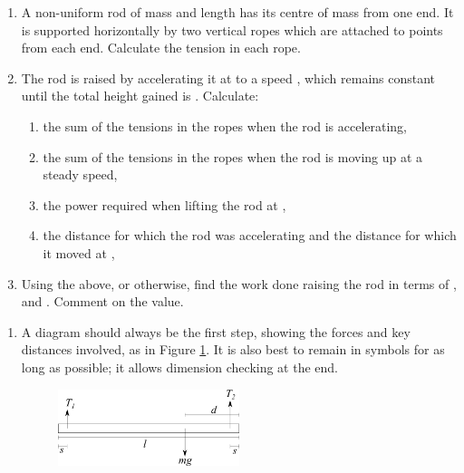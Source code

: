
\begin{problem} %
{\begin{enumerate}
	\item A non-uniform rod of mass  and length  has its centre of mass  from one end. It is supported horizontally by two vertical ropes which are attached to points  from each end. Calculate the tension in each rope.
	\item The rod is raised by accelerating it at  to a speed , which remains constant until the total height gained is . Calculate:
	\begin{enumerate}
		\item the sum of the tensions in the ropes when the rod is accelerating,
		\item the sum of the tensions in the ropes when the rod is moving up at a steady speed,
		\item the power required when lifting the rod at ,
		\item the distance for which the rod was accelerating and the distance for which it moved at ,
	\end{enumerate}
	\item Using the above, or otherwise, find the work done raising the rod in terms of ,  and . Comment on the value.
\end{enumerate}
}
{}
{\begin{enumerate}
	\item A diagram should always be the first step, showing the forces and key distances involved, as in Figure \ref{fig:Dynamics_rod_forces}. It is also best to remain in symbols for as long as possible; it allows dimension checking at the end.

\begin{figure}[h]
\centering
\includegraphics[width=0.5\textwidth]{../../../figures/Dynamics_rod_forces}
\caption{}\label{fig:Dynamics_rod_forces}
\end{figure}


\end{enumerate}}
\end{problem}
